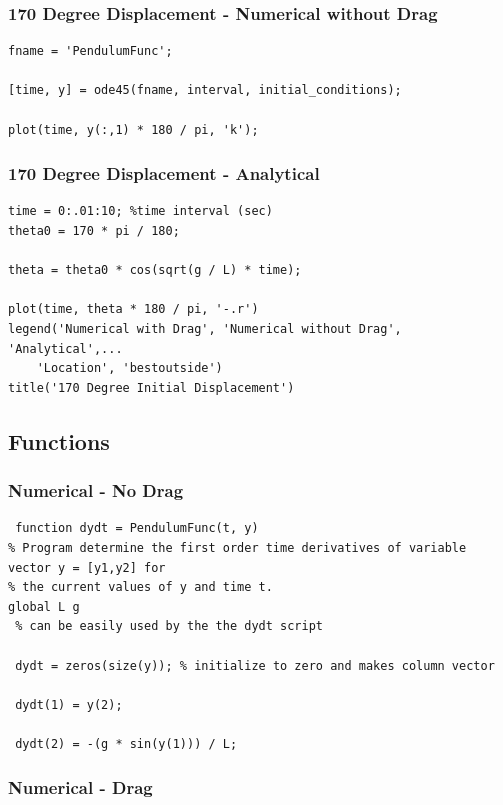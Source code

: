 \documentclass{article}
\begin{document}
\subsubsection{170 Degree Displacement - Numerical without Drag}
\label{170nodrag}

\begin{verbatim}
fname = 'PendulumFunc';

[time, y] = ode45(fname, interval, initial_conditions);

plot(time, y(:,1) * 180 / pi, 'k');
\end{verbatim}



\subsubsection{170 Degree Displacement - Analytical}

\begin{verbatim}
time = 0:.01:10; %time interval (sec)
theta0 = 170 * pi / 180;

theta = theta0 * cos(sqrt(g / L) * time);

plot(time, theta * 180 / pi, '-.r')
legend('Numerical with Drag', 'Numerical without Drag', 'Analytical',...
    'Location', 'bestoutside')
title('170 Degree Initial Displacement')
\end{verbatim}


\subsection{Functions}
\subsubsection{Numerical - No Drag}
\label{noDrag}

 \begin{verbatim}
 function dydt = PendulumFunc(t, y)
% Program determine the first order time derivatives of variable vector y = [y1,y2] for
% the current values of y and time t.
global L g
 % can be easily used by the the dydt script

 dydt = zeros(size(y)); % initialize to zero and makes column vector

 dydt(1) = y(2);

 dydt(2) = -(g * sin(y(1))) / L;
\end{verbatim}

\subsubsection{Numerical - Drag}
\label{drag}
\end{document}
